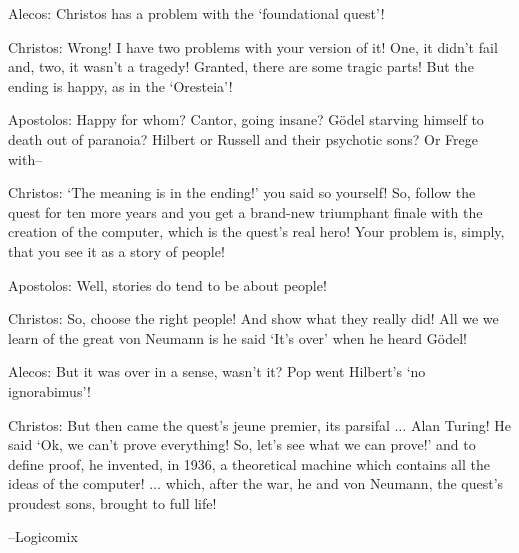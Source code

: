 \newpage

{

\narrower\parindent=0pt
\baselineskip

{\it

Alecos: Christos has a problem with the `foundational quest'!

Christos:  Wrong!  I have two problems with your  {\rm {version}} of it!  One, it
didn't fail and, two, it wasn't a tragedy!  Granted, there are some tragic
parts!  But the ending is happy, as in the `Oresteia'!  

Apostolos:  Happy for whom?  Cantor, going insane?  G\"odel starving himself to
death out of paranoia? Hilbert or Russell and their psychotic sons? Or Frege with--

Christos: `The meaning
is in the ending!' you said so yourself!  So, follow the quest for ten more years and
you get a brand-new triumphant finale with the creation of the computer, which is the
quest's real hero!   Your problem is, simply, that you see it as a story of people!

Apostolos: Well, stories do tend to be about people!

Christos:  So, choose the right people!  And show what they really did!  All we we learn
of the great von Neumann is he said `It's over'  when he heard G\"odel!

Alecos: But it was over in a sense, wasn't it?  Pop went Hilbert's `no ignorabimus'!

Christos:  But then came the quest's jeune premier, its parsifal $\ldots$ Alan Turing!
He said `Ok, we can't prove everything! So, let's see what we can prove!' and to define
proof, he invented, in 1936, a theoretical machine which contains all the ideas of the
computer! $\ldots$ which, after the war, he and von Neumann, the quest's proudest sons,
brought to full life!

{\hfill--Logicomix} %

}

}




\newpage


